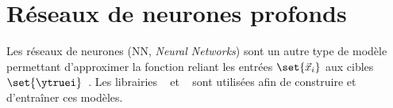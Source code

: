 \section{Réseaux de neurones profonds}\label{chapter-ML-section-DNN}
Les réseaux de neurones (NN, \emph{Neural Networks}) sont un autre type de modèle permettant d'approximer la fonction reliant les entrées $\set{\vec{x}_i}$ aux cibles $\set{\ytruei}$~\cite{Sarle1994NeuralNA,DNN}.
Les librairies
\KERAS~\cite{keras}
et
\TENSORFLOW~\cite{tensorflow}
sont utilisées afin de construire et d'entraîner ces modèles.



